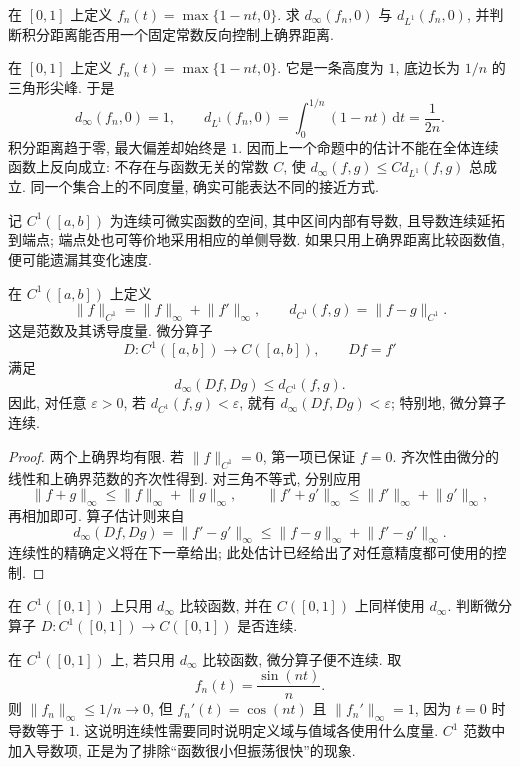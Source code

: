 \begin{example}
\label{ch:metric:spikes}在 $[0,1]$ 上定义 $f_n(t)=\max\{1-nt,0\}$. 求 $d_\infty(f_n,0)$ 与 $d_{L^1}(f_n,0)$, 并判断积分距离能否用一个固定常数反向控制上确界距离.
\end{example}
\begin{solution}

在 $[0,1]$ 上定义 $f_n(t)=\max\{1-nt,0\}$. 它是一条高度为 $1$, 底边长为 $1/n$ 的三角形尖峰. 于是
\[
 d_\infty(f_n,0)=1,\qquad
 d_{L^1}(f_n,0)=\int_0^{1/n}(1-nt)\,\mathrm{d}t=\frac1{2n}.
\]
积分距离趋于零, 最大偏差却始终是 $1$. 因而上一个命题中的估计不能在全体连续函数上反向成立: 不存在与函数无关的常数 $C$, 使 $d_\infty(f,g)\le C d_{L^1}(f,g)$ 总成立. 同一个集合上的不同度量, 确实可能表达不同的接近方式.
\end{solution}

\label{ch:metric:c1}
记 $C^1([a,b])$ 为连续可微实函数的空间, 其中区间内部有导数, 且导数连续延拓到端点; 端点处也可等价地采用相应的单侧导数. 如果只用上确界距离比较函数值, 便可能遗漏其变化速度.

\begin{proposition}[$C^1$ 范数与微分算子]\label{ch:metric:derivative}
在 $C^1([a,b])$ 上定义
\[
 \lVert f\rVert_{C^1}=\lVert f\rVert_\infty+\lVert f'\rVert_\infty,
 \qquad
 d_{C^1}(f,g)=\lVert f-g\rVert_{C^1}.
\]
这是范数及其诱导度量. 微分算子
\[
 D:C^1([a,b])\to C([a,b]),\qquad Df=f'
\]
满足
\[
 d_\infty(Df,Dg)\le d_{C^1}(f,g).
\]
因此, 对任意 $\varepsilon>0$, 若 $d_{C^1}(f,g)<\varepsilon$, 就有 $d_\infty(Df,Dg)<\varepsilon$; 特别地, 微分算子连续.
\end{proposition}
\begin{proof}
两个上确界均有限. 若 $\lVert f\rVert_{C^1}=0$, 第一项已保证 $f=0$. 齐次性由微分的线性和上确界范数的齐次性得到. 对三角不等式, 分别应用
\[
 \lVert f+g\rVert_\infty\le\lVert f\rVert_\infty+\lVert g\rVert_\infty,
 \qquad
 \lVert f'+g'\rVert_\infty\le\lVert f'\rVert_\infty+\lVert g'\rVert_\infty,
\]
再相加即可. 算子估计则来自
\[
 d_\infty(Df,Dg)=\lVert f'-g'\rVert_\infty
 \le\lVert f-g\rVert_\infty+\lVert f'-g'\rVert_\infty.
\]
连续性的精确定义将在下一章给出; 此处估计已经给出了对任意精度都可使用的控制.
\end{proof}

\begin{example}
在 $C^1([0,1])$ 上只用 $d_\infty$ 比较函数, 并在 $C([0,1])$ 上同样使用 $d_\infty$. 判断微分算子 $D:C^1([0,1])\to C([0,1])$ 是否连续.
\end{example}
\begin{solution}
在 $C^1([0,1])$ 上, 若只用 $d_\infty$ 比较函数, 微分算子便不连续. 取
\[
 f_n(t)=\frac{\sin(nt)}n.
\]
则 $\lVert f_n\rVert_\infty\le1/n\to0$, 但 $f_n'(t)=\cos(nt)$ 且 $\lVert f_n'\rVert_\infty=1$, 因为 $t=0$ 时导数等于 $1$. 这说明连续性需要同时说明定义域与值域各使用什么度量. $C^1$ 范数中加入导数项, 正是为了排除``函数很小但振荡很快''的现象.
\end{solution}

